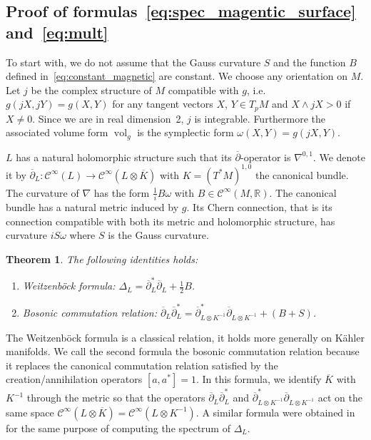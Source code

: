 \documentclass[10pt,a4paper]{article}
\newtheorem{theo}{Theorem}[section]
\theoremstyle{definition}
\numberwithin{equation}{section}
\newcommand{\R}{{\mathbb{R}}}
\newcommand{\om}{{\omega}}
\newcommand{\con}{\overline}
\newcommand{\op}{\operatorname}
\newcommand{\Ci}{{\mathcal{C}}^{\infty}}
\begin{document}
\subsection*{Proof of formulas~\eqref{eq:spec_magentic_surface} and~\eqref{eq:mult}}

To start with, we do not assume that the Gauss curvature $S$ and the function $B$ defined in~\eqref{eq:constant_magnetic} are constant. We choose any orientation on $M$. Let $j$ be the complex structure of $M$ compatible with $g$, i.e. $g(jX, jY) = g(X,Y)$ for any tangent vectors $X$, $Y \in T_pM$ and $ X
\wedge jX >0$ if $X \neq 0$. Since we are in real dimension~2, $j$ is integrable. Furthermore the associated volume form $\op{vol}_g$ is the symplectic form $\om (X, Y) = g(jX, Y)$.

$L$ has a natural holomorphic structure such that its $\con{\partial}$-operator is $\nabla^{0,1}$. We denote it by $\con{\partial}_L: \Ci (L) \rightarrow \Ci (L \otimes \con{K})$ with $K = (T^*M)^{1,0}$ the canonical bundle. The curvature of $\nabla$ has the form $\frac{1}{i} B \om$ with $B \in \Ci (M, \R)$. The canonical bundle has a natural metric induced by $g$. Its Chern connection, that is its connection compatible with both its metric and holomorphic structure, has curvature $i S \om$ where $S$ is the Gauss curvature.

\begin{theo}\label{theo:appendix}
The following identities holds:
\begin{enumerate}
\item\label{theo7.1.1} Weitzenb\"ock formula: $\Delta_L = \con{\partial}^*_L \con{\partial}_L + \frac{1}{2} B$.
\item\label{theo7.1.2} Bosonic commutation relation: $ \con{\partial}_L \con{\partial}_L^* = \con{\partial}_{L\otimes K^{-1}} ^* \con{\partial}_{L\otimes K^{-1}} + (B + S)$.
\end{enumerate}
\end{theo}

The Weitzenb\"ock formula is a classical relation, it holds more generally on K\"ahler manifolds. We call the second formula the bosonic commutation relation because it replaces the canonical commutation relation satisfied by the creation/annihilation operators $[a, a^{*}] =1$. In this formula, we identify $\con{K}$ with $K^{-1}$ through the metric so that the operators $ \con{\partial}_L \con{\partial}_L^*$ and $\con{\partial}_{L\otimes K^{-1}} ^* \con{\partial}_{L\otimes K^{-1}}$ act on the same space $\Ci (L\otimes \con{K}) = \Ci (L
\otimes K^{-1})$. A similar formula were obtained in~\cite[Proposition~9]{Te06} for the same purpose of computing the spectrum of $\Delta_L$.
\end{document}
